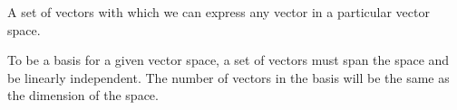 A set of vectors with which we can express any vector in a particular vector space.
\par
To be a basis for a given vector space, a set of vectors must span the space and
be linearly independent. The number of vectors in the basis will be the same as
the dimension of the space.